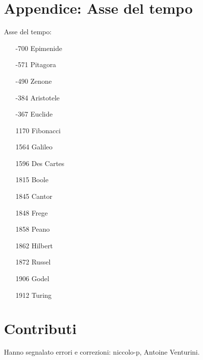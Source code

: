 \documentclass[italian,a4paper,hidelinks,headinclude]{scrartcl}
\begin{document}
\section{Appendice: Asse del tempo}
Asse del tempo:
\begin{itemize}
\item[-700] Epimenide
\item[-571] Pitagora
\item[-490] Zenone
\item[-384] Aristotele
\item[-367] Euclide
\item[1170] Fibonacci
\item[1564] Galileo
\item[1596] Des Cartes
\item[1815] Boole
\item[1845] Cantor
\item[1848] Frege
\item[1858] Peano
\item[1862] Hilbert
\item[1872] Russel
\item[1906] Godel
\item[1912] Turing
\end{itemize}

\section{Contributi}

Hanno segnalato errori e correzioni:
niccolo-p,
Antoine Venturini.
\end{document}
